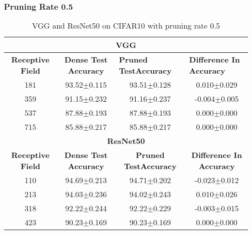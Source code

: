 \subsubsection*{Pruning Rate 0.5}
\begin{table}[H]
\begin{tabular}{@{}cccc@{}}
\toprule
\multicolumn{4}{c}{\textbf{VGG}}                                                                                                                                  \\ \midrule
\textbf{Receptive Field} & \textbf{Dense Test Accuracy} & \multicolumn{1}{l}{\textbf{Pruned  TestAccuracy}} & \multicolumn{1}{l}{\textbf{Difference In Accuracy}} \\ \midrule
181                      & 93.52$\pm$0.115              & 93.51$\pm$0.128                                   & 0.010$\pm$0.029                                     \\
359                      & 91.15$\pm$0.232              & 91.16$\pm$0.237                                   & -0.004$\pm$0.005                                    \\
537                      & 87.88$\pm$0.193              & 87.88$\pm$0.193                                   & 0.000$\pm$0.000                                     \\
715                      & 85.88$\pm$0.217              & 85.88$\pm$0.217                                   & 0.000$\pm$0.000                                     \\ \midrule
\multicolumn{4}{c}{\textbf{ResNet50}}                                                                                                                             \\ \midrule
\textbf{Receptive Field} & \textbf{Dense Test Accuracy} & \textbf{Pruned  TestAccuracy}                     & \textbf{Difference In Accuracy}                     \\
110                      & 94.69$\pm$0.213              & 94.71$\pm$0.202                                   & -0.023$\pm$0.012                                    \\
213                      & 94.03$\pm$0.236              & 94.02$\pm$0.243                                   & 0.010$\pm$0.026                                     \\
318                      & 92.22$\pm$0.244              & 92.22$\pm$0.229                                   & -0.003$\pm$0.015                                    \\
423                      & 90.23$\pm$0.169              & 90.23$\pm$0.169                                   & 0.000$\pm$0.000                                     \\ \bottomrule
\end{tabular}
\caption{VGG and ResNet50 on CIFAR10 with pruning rate 0.5}
\label{tab:cifar10 pruning rate05}
\end{table}
